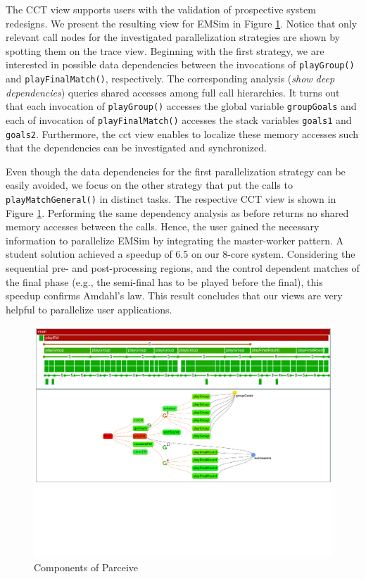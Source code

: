 The CCT view supports users with the validation of prospective system
redesigns. We present the resulting view for EMSim in Figure \ref{fig:emsim}.
Notice that only relevant call nodes for the investigated parallelization
strategies are shown by spotting them on the trace view. Beginning with the
first strategy, we are interested in possible data dependencies between the
invocations of \texttt{playGroup()} and \texttt{playFinalMatch()},
respectively. The corresponding analysis (\textit{show deep dependencies})
queries shared accesses among full call hierarchies. It turns out that each
invocation of \texttt{playGroup()} accesses the global variable
\texttt{groupGoals} and each of invocation of \texttt{playFinalMatch()}
accesses the stack variables \texttt{goals1} and \texttt{goals2}.
Furthermore, the cct view enables to localize these memory accesses such that
the dependencies can be investigated and synchronized.

Even though the data dependencies for the first parallelization strategy can
be easily avoided, we focus on the other strategy that put the calls to
\texttt{playMatchGeneral()} in distinct tasks. The respective CCT view is shown
in Figure \ref{fig:emsim}. Performing the same dependency analysis as
before returns no shared memory accesses between the calls. Hence, the user
gained the necessary information to parallelize EMSim by integrating the
master-worker pattern. A student solution achieved a speedup of 6.5 on our
8-core system. Considering the sequential pre- and post-processing regions,
and the control dependent matches of the final phase (e.g., the semi-final has 
to be played before the final), this speedup confirms Amdahl's law. This result
concludes that our views are very helpful to parallelize user applications.

\begin{figure}[ht!]
	\begin{center}
		\includegraphics[clip, trim=0cm 7.0cm 0cm 0cm,
width=\linewidth]{img/emsim_overview.pdf}
		\caption{Components of Parceive}
		\label{fig:emsim}
	\end{center}
\end{figure}

